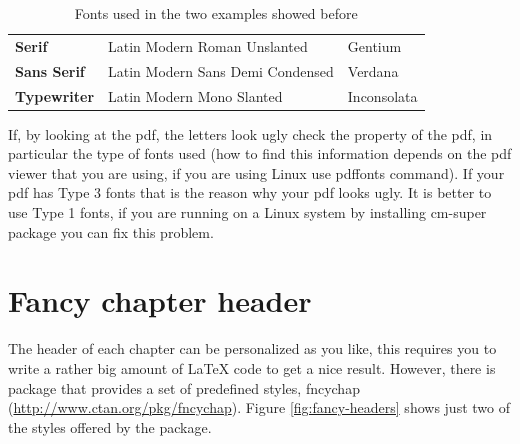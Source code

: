 \begin{center}
\begin{table}[h]
\centering{}\caption{\label{tab:font-names}Fonts used in the two examples showed before}
\begin{tabular}{lll}
\toprule 
\textbf{Serif} & Latin Modern Roman Unslanted & Gentium\tabularnewline
\textbf{Sans Serif} & Latin Modern Sans Demi Condensed & Verdana\tabularnewline
\textbf{Typewriter} & Latin Modern Mono Slanted & Inconsolata\tabularnewline
\bottomrule
\end{tabular}
\end{table}
\par\end{center}

If, by looking at the \textsf{pdf}, the letters look ugly check the
property of the \textsf{pdf}, in particular the type of fonts used
(how to find this information depends on the \textsf{pdf} viewer that
you are using, if you are using Linux use \textsf{pdffonts} command).
If your \textsf{pdf} has \textsf{Type 3} fonts that is the reason
why your \textsf{pd}f looks ugly. It is better to use \textsf{Type
1} fonts, if you are running \LyX{} on a Linux system by installing
\textsf{cm-super} package you can fix this problem.

\section{Fancy chapter header}

The header of each chapter can be personalized as you like, this requires
you to write a rather big amount of \LaTeX{} code to get a nice result.
However, there is package that provides a set of predefined styles,
\textsf{fncychap} (\url{http://www.ctan.org/pkg/fncychap}). Figure
\ref{fig:fancy-headers} shows just two of the styles offered by the
package.

